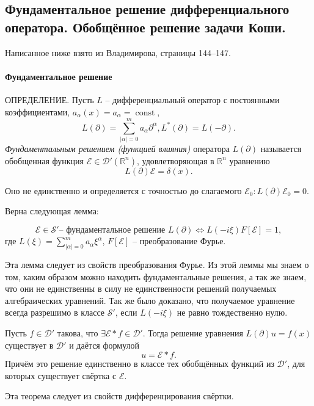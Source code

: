 \subsection{Фундаментальное решение дифференциального оператора. Обобщённое решение задачи Коши.}

Написанное ниже взято из Владимирова, страницы 144--147.

\paragraph{Фундаментальное решение}
ОПРЕДЕЛЕНИЕ. Пусть $L$ -- дифференциальный оператор с постоянными коэффициентами,
$a_\alpha (x) = a_\alpha = \operatorname{const}$,
\[
  L(\partial) = \sum_{|\alpha| = 0}^m a_\alpha \partial^\alpha, L^* (\partial) = L(-\partial).
\]
\emph{Фундаментальным решением (функцией влияния)} оператора $L(\partial)$ называется обобщенная
функция $\mathcal{E} \in \mathcal{D}' (\mathbb{R}^n)$, удовлетворяющая в $\mathbb{R}^n$ 
уравнению
\[
  L(\partial) \mathcal{E} = \delta (x).
\]

Оно не единственно и определяется с точностью до слагаемого
$\mathcal{E}_0: L(\partial) \mathcal{E}_0 = 0$.

Верна следующая лемма:
\begin{theorem}
  \[
    \mathcal{E} \in \mathcal{S}' \text{-- фундаментальное решение $L(\partial)$}
    \Leftrightarrow
    L(-i \xi) F[\mathcal{E}] = 1,
  \]
  где $L(\xi) = \sum_{|\alpha|=0}^m a_\alpha \xi^\alpha$, $F[\mathcal{E}]$ -- преобразование Фурье.
\end{theorem}

Эта лемма следует из свойств преобразования Фурье. Из этой леммы мы знаем о том, каким образом можно
находить фундаментальные решения, а так же знаем, что они не единственны в силу не единственности 
решений получаемых алгебраических уравнений. Так же было доказано, что получаемое уравнение всегда разрешимо в классе $\mathcal{S}'$, если $L(-i\xi)$ не равно тождественно нулю.


\begin{theorem}
  Пусть $f \in \mathcal{D}'$ такова, что $\exists \mathcal{E} * f \in \mathcal{D}'$. Тогда решение
  уравнения $L(\partial) u = f(x)$ существует в $\mathcal{D}'$ и даётся формулой
  \[
    u = \mathcal{E} * f.
  \]
  Причём это решение единственно в классе тех обобщённых функций из $\mathcal{D}'$, для которых
  существует свёртка с $\mathcal{E}$.
\end{theorem}
Эта теорема следует из свойств дифференцирования свёртки.



